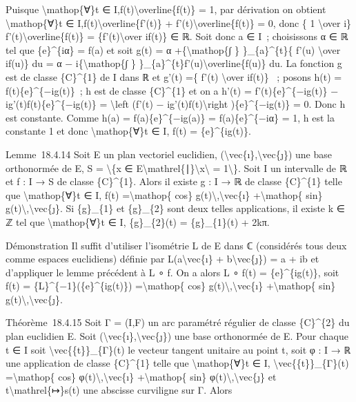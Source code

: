 \documentclass[]{article}
\begin{document}
Puisque \textbackslash{}mathop\{∀\}t ∈
I,f(t)\textbackslash{}overline\{f(t)\} = 1, par dérivation on obtient
\textbackslash{}mathop\{∀\}t ∈ I,f(t)\textbackslash{}overline\{f'(t)\} +
f'(t)\textbackslash{}overline\{f(t)\} = 0, donc \{ 1
\textbackslash{}over i\} f'(t)\textbackslash{}overline\{f(t)\} =
\{f'(t)\textbackslash{}over if(t)\} ∈ ℝ. Soit donc a ∈ I~; choisissons α
∈ ℝ tel que \{e\}\^{}\{iα\} = f(a) et soit g(t) = α
+\{\textbackslash{}mathop\{∫ \} \}\_\{a\}\^{}\{t\}\{ f'(u)
\textbackslash{}over if(u)\} du = α − i\{\textbackslash{}mathop\{∫ \}
\}\_\{a\}\^{}\{t\}f'(u)\textbackslash{}overline\{f(u)\} du. La fonction
g est de classe \{C\}\^{}\{1\} de I dans ℝ et g'(t) =\{ f'(t)
\textbackslash{}over if(t)\} ~; posons h(t) = f(t)\{e\}\^{}\{−ig(t)\}~;
h est de classe \{C\}\^{}\{1\} et on a h'(t) = f'(t)\{e\}\^{}\{−ig(t)\}
− ig'(t)f(t)\{e\}\^{}\{−ig(t)\} = \textbackslash{}left (f'(t) −
ig'(t)f(t)\textbackslash{}right )\{e\}\^{}\{−ig(t)\} = 0. Donc h est
constante. Comme h(a) = f(a)\{e\}\^{}\{−ig(a)\} = f(a)\{e\}\^{}\{−iα\} =
1, h est la constante 1 et donc \textbackslash{}mathop\{∀\}t ∈ I, f(t) =
\{e\}\^{}\{ig(t)\}.

Lemme~18.4.14 Soit E un plan vectoriel euclidien,
(\textbackslash{}vec\{ı\},\textbackslash{}vec\{ȷ\}) une base orthonormée
de E, S = \textbackslash{}\{x ∈
E\textbackslash{}mathrel\{∣\}\textbackslash{}\textbar{}x\textbackslash{}\textbar{}
= 1\textbackslash{}\}. Soit I un intervalle de ℝ et f : I → S de classe
\{C\}\^{}\{1\}. Alors il existe g : I → ℝ de classe \{C\}\^{}\{1\} telle
que \textbackslash{}mathop\{∀\}t ∈ I, f(t) =\textbackslash{}mathop\{
cos\} g(t)\textbackslash{},\textbackslash{}vec\{ı\}
+\textbackslash{}mathop\{ sin\}
g(t)\textbackslash{},\textbackslash{}vec\{ȷ\}. Si \{g\}\_\{1\} et
\{g\}\_\{2\} sont deux telles applications, il existe k ∈ ℤ tel que
\textbackslash{}mathop\{∀\}t ∈ I, \{g\}\_\{2\}(t) = \{g\}\_\{1\}(t) +
2kπ.

Démonstration Il suffit d'utiliser l'isométrie L de E dans ℂ (considérés
tous deux comme espaces euclidiens) définie par
L(a\textbackslash{}vec\{ı\} + b\textbackslash{}vec\{ȷ\}) = a + ib et
d'appliquer le lemme précédent à L ∘ f. On a alors L ∘ f(t) =
\{e\}\^{}\{ig(t)\}, soit f(t) = \{L\}\^{}\{−1\}(\{e\}\^{}\{ig(t)\})
=\textbackslash{}mathop\{ cos\}
g(t)\textbackslash{},\textbackslash{}vec\{ı\} +\textbackslash{}mathop\{
sin\} g(t)\textbackslash{},\textbackslash{}vec\{ȷ\}.

Théorème~18.4.15 Soit Γ = (I,F) un arc paramétré régulier de classe
\{C\}\^{}\{2\} du plan euclidien E. Soit
(\textbackslash{}vec\{ı\},\textbackslash{}vec\{ȷ\}) une base orthonormée
de E. Pour chaque t ∈ I soit \textbackslash{}vec\{\{t\}\}\_\{Γ\}(t) le
vecteur tangent unitaire au point t, soit φ : I → ℝ une application de
classe \{C\}\^{}\{1\} telle que \textbackslash{}mathop\{∀\}t ∈ I,
\textbackslash{}vec\{\{t\}\}\_\{Γ\}(t) =\textbackslash{}mathop\{ cos\}
φ(t)\textbackslash{},\textbackslash{}vec\{ı\} +\textbackslash{}mathop\{
sin\} φ(t)\textbackslash{},\textbackslash{}vec\{ȷ\} et
t\textbackslash{}mathrel\{↦\}s(t) une abscisse curviligne sur Γ. Alors
\end{document}
